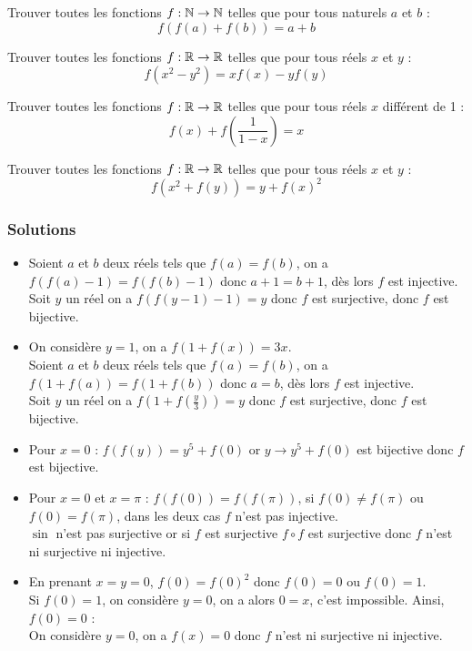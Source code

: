 \begin{exo}
Trouver toutes les fonctions $f:\mathbb N\to\mathbb N$ telles que pour tous naturels $a$ et $b$ :
$$f(f(a)+f(b))=a+b$$
\end{exo}


\begin{exo}
Trouver toutes les fonctions $f:\mathbb R\to\mathbb R$ telles que pour tous réels $x$ et $y$ :
$$f(x^2-y^2)=xf(x)-yf(y)$$
\end{exo}


\begin{exo}
Trouver toutes les fonctions $f:\mathbb R\to\mathbb R$ telles que pour tous réels $x$ différent de 1 :
$$f(x)+f\left(\frac1{1-x}\right)=x$$
\end{exo}


\begin{exo}
Trouver toutes les fonctions $f:\mathbb R\to\mathbb R$ telles que pour tous réels $x$ et $y$ :
$$f(x^2+f(y))=y+f(x)^2$$
\end{exo}


\subsubsection{Solutions}


\begin{sol}[][1]
\begin{itemize}
    \item Soient $a$ et $b$ deux réels tels que $f(a)=f(b)$, on a $f(f(a)-1)=f(f(b)-1)$ donc $a+1=b+1$, dès lors $f$ est injective.\\
    Soit $y$ un réel on a $f(f(y-1)-1)=y$ donc $f$ est surjective, donc $f$ est bijective.
    \item On considère $y=1$, on a $f(1+f(x))=3x$.\\
    Soient $a$ et $b$ deux réels tels que $f(a)=f(b)$, on a $f(1+f(a))=f(1+f(b))$ donc $a=b$, dès lors $f$ est injective.\\
    Soit $y$ un réel on a $f(1+f(\frac y3))=y$ donc $f$ est surjective, donc $f$ est bijective.
    \item Pour $x=0$ : $f(f(y))=y^5+f(0)$ or $y\to y^5+f(0)$ est bijective donc $f$ est bijective.
    \item Pour $x=0$ et $x=\pi$ : $f(f(0))=f(f(\pi))$, si $f(0)\ne f(\pi)$ ou $f(0)=f(\pi)$, dans les deux cas $f$ n'est pas injective.\\
    $\sin$ n'est pas surjective or si $f$ est surjective $f\circ f$ est surjective donc $f$ n'est ni surjective ni injective.
    \item En prenant $x=y=0$, $f(0)=f(0)^2$ donc $f(0)=0$ ou $f(0)=1$.\\
    Si $f(0)=1$, on considère $y=0$, on a alors $0=x$, c'est impossible. Ainsi, $f(0)=0$ :\\
    On considère $y=0$, on a $f(x)=0$ donc $f$ n'est ni surjective ni injective.
\end{itemize}
\end{sol}


